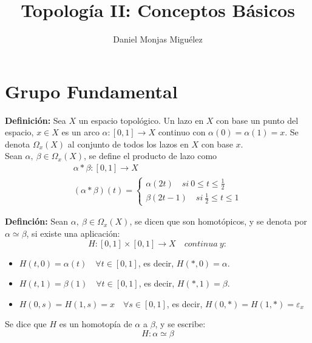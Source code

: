 \documentclass{article}
\author{Daniel Monjas Miguélez}
\title{Topología II: Conceptos Básicos}
\begin{document}
\maketitle
\newpage
\tableofcontents
\newpage

\section{Grupo Fundamental}
\textbf{Definición:} Sea $X$ un espacio topológico. Un lazo en $X$ con base un punto del espacio, $x\in X$ es un arco $\alpha:[0,1]\rightarrow X$ continuo con $\alpha(0)=\alpha(1)=x$. Se denota $\Omega_{x}(X)$ al conjunto de todos los lazos en $X$ con base $x$. \\

Sean $\alpha,\:\beta\in \Omega_{x}(X)$, se define el producto de lazo como
\begin{gather*}
\alpha*\beta:[0,1]\rightarrow X \\
(\alpha*\beta)(t)=\left\lbrace \begin{array}{c}
\alpha(2t)\quad si\:0\leq t\leq \frac{1}{2} \\
\beta(2t-1)\quad si\:\frac{1}{2}\leq t\leq 1
\end{array} \right.
\end{gather*}

\textbf{Definción:} Sean $\alpha,\:\beta\in \Omega_x(X)$, se dicen que son homotópicos, y se denota por $\alpha\simeq \beta$, si existe una aplicación:
\begin{equation*}
H:[0,1]\times[0,1]\rightarrow X\quad continua\:y:
\end{equation*}

\begin{itemize}
\item $H(t,0)=\alpha(t)\quad \forall t\in [0,1]$, es decir, $H(*,0)=\alpha$.

\item $H(t,1)=\beta(1)\quad \forall t\in [0,1]$, es decir, $H(*,1)=\beta$.

\item $H(0,s)=H(1,s)=x\quad \forall s\in [0,1]$, es decir, $H(0,*)=H(1,*)=\varepsilon_x$
\end{itemize}

Se dice que $H$ es un homotopía de $\alpha$ a $\beta$, y se escribe:
\begin{equation*}
H:\alpha\simeq \beta
\end{equation*}
\end{document}
